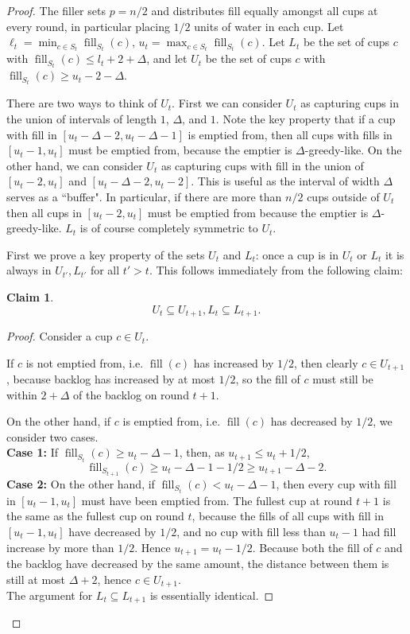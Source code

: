 \documentclass[twocolumn]{article}[10pt]
\DeclareMathOperator{\fil}{\text{fill}}
\newtheorem{clm}{Claim}
\begin{document}
\begin{proof}
  The filler sets $p=n/2$ and distributes fill equally amongst
  all cups at every round, in particular placing $1/2$ units of water in each cup.
  Let $\ell_t = \min_{c\in S_t} \fil_{S_t}(c)$, $u_t=\max_{c\in S_t} \fil_{S_t}(c)$. Let
  $L_t$ be the set of cups $c$ with $\fil_{S_t}(c) \le l_t+2+\Delta$, and let
  $U_t$ be the set of cups $c$ with $\fil_{S_t}(c) \ge u_t-2-\Delta$.

  There are two ways to think of $U_t$.
  First we can consider $U_t$ as capturing cups in the union of intervals of length $1$,
  $\Delta$, and $1$. Note the key property that if a cup with fill in
  $[u_t-\Delta-2, u_t-\Delta-1]$ is emptied from, then all cups with fills in 
  $[u_t-1, u_t]$ must be emptied from, because the emptier is $\Delta$-greedy-like.
  On the other hand, we can consider $U_t$ as capturing cups with fill in the union of $[u_t-2, u_t]$ and
  $[u_t-\Delta-2, u_t-2]$. This is useful as the interval of width $\Delta$
  serves as a ``buffer". In particular, if there are more than $n/2$ cups
  outside of $U_t$ then all cups in $[u_t-2, u_t]$ must be emptied from because
  the emptier is $\Delta$-greedy-like. $L_t$ is of course completely symmetric to $U_t$.

  First we prove a key property of the sets $U_t$ and $L_t$: once a cup is in
  $U_t$ or $L_t$ it is always in $U_{t'}, L_{t'}$ for all $t' > t$. This
  follows immediately from the following claim:
  \begin{clm}
    \label{clm:dontlosestuff}
    $$U_{t} \subseteq U_{t+1}, L_t \subseteq L_{t+1}.$$
  \end{clm}
  \begin{proof}
    Consider a cup $c\in U_t$.

    If $c$ is not emptied from, i.e. $\fil(c)$ has increased by $1/2$, then
    clearly $c \in U_{t+1}$, because backlog has increased by at most $1/2$, so
    the fill of $c$ must still be within $2+\Delta$ of the backlog on round $t+1$. 

    On the other hand, if $c$ is emptied from, i.e. $\fil(c)$ has decreased by
    $1/2$, we consider two cases.\\
    \textbf{Case 1:} If $\fil_{S_t}(c) \ge u_t-\Delta -1$, then, as $u_{t+1} \le u_t+1/2$, 
      $$\fil_{S_{t+1}}(c) \ge u_t-\Delta-1 - 1/2\ge u_{t+1}-\Delta-2.$$
    \textbf{Case 2:} On the other hand, if $\fil_{S_t}(c) < u_t-\Delta-1$, then every cup
        with fill in $[u_t-1, u_t]$ must have been emptied
        from. The fullest cup at round $t+1$ is the same as the fullest cup on
        round $t$, because the fills of all cups with fill in
        $[u_t-1, u_t]$ have decreased by $1/2$, and no cup with fill less than
        $u_t-1$ had fill increase by more than $1/2$. Hence $u_{t+1} = u_t -1/2$.
        Because both the fill of $c$ and the backlog have decreased by the same
        amount, the distance between them is still at most $\Delta+2$, hence
        $c\in U_{t+1}$.\\
    The argument for $L_t \subseteq L_{t+1}$ is essentially identical.
  \end{proof}


\end{proof}
\end{document}
